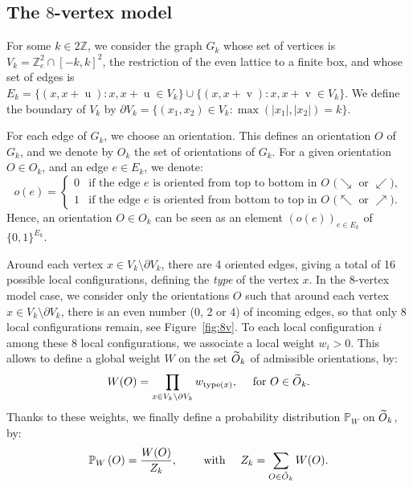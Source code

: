 \documentclass[10pt]{amsart}
\theoremstyle{definition}\newtheorem{defi}[theo]{Definition}\newtheorem{rema}[theo]{Remark}\newtheorem{exam}[theo]{Example}\newtheorem{exem}[theo]{Example}\newtheorem{nota}[theo]{Notation}
\let\oldtilde\tilde
\renewcommand*{\tilde}[1]{\mathchoice{\widetilde{#1}}{\widetilde{#1}}{\oldtilde{#1}}{\oldtilde{#1}}}
\newcounter{a}
\newcommand{\pw}[1]{\mathbb{P}_W\left(#1\right)}
\newcommand{\Z}{\mathbb{Z}}
\DeclareMathOperator{\vu}{u}
\DeclareMathOperator{\vv}{v}
\begin{document}
\subsection{The \texorpdfstring{$8$}{8}-vertex model} \label{sec:8V}

For some $k\in 2\Z$, we consider the graph $G_k$ whose set of vertices is $V_k=\Z_{e}^2 \cap [-k,k]^2$, the restriction of the even lattice to a finite box, and whose set of edges is $E_k=\{(x,x+\vu) : x,x+\vu\in V_k\}\cup\{(x,x+\vv) : x,x+\vv\in V_k\}$. We define the boundary of $V_k$ by $\partial V_k=\{(x_1,x_2)\in V_k : \max(|x_1|,|x_2|)=k\}$.

For each edge of $G_k$, we choose an orientation. This defines an orientation $O$ of $G_k$, and we denote by $O_k$ the set of orientations of $G_k$. For a given orientation $O\in O_k$, and an edge $e \in E_k$, we denote:
\[
o(e) =
\begin{cases}
0 & \text{if the edge $e$ is oriented from top to bottom in $O$ ($\searrow$ or $\swarrow$)},\\
1 & \text{if the edge $e$ is oriented from bottom to top in $O$ ($\nwarrow$ or $\nearrow$)}.
\end{cases}
\]
Hence, an orientation $O\in O_k$ can be seen as an element $(o(e))_{e \in E_k}$ of $\{0,1\}^{E_k}$.

Around each vertex $x\in V_k\setminus \partial V_k$, there are 4 oriented edges, giving a total of 16 possible local configurations, defining the \emph{type} of the vertex $x$. In the 8-vertex model case, we consider only the orientations $O$ such that around each vertex $x\in V_k\setminus \partial V_k$, there is an even number ($0$, $2$ or $4$) of incoming edges, so that only $8$ local configurations remain, see Figure~\ref{fig:8v}. To each local configuration $i$ among these 8 local configurations, we associate a local weight $w_i>0$. This allows to define a global weight $W$ on the set $\tilde O_k$ of admissible orientations, by:
\begin{equation*}
W(O) = \prod_{x\in V_k\setminus \partial V_k} w_{\text{type}(x)}, \quad \text{ for } O\in\tilde O_k.
\end{equation*}
Thanks to these weights, we finally define a probability distribution $\mathbb{P}_W$ on $\tilde O_k$, by:
\begin{equation*}
\pw{O} = \frac{W(O)}{Z_k}, \qquad \text{ with } \quad {Z_k=\sum_{O \in \tilde O_k} W(O)}.
\end{equation*}
\end{document}
